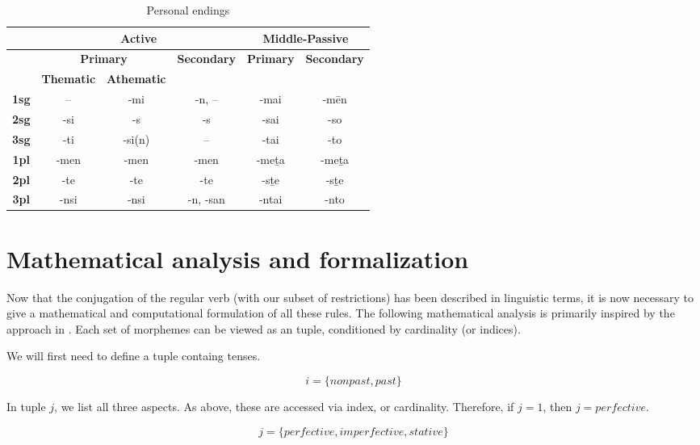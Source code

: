 \documentclass[12pt]{article}
\begin{document}
\begin{table*}
\centering
\begin{tabular}{|c|c|c|c|c|c|}
    \hline
    & \multicolumn{3}{c|}{\textbf{Active}} & \multicolumn{2}{c|}{\textbf{Middle-Passive}}\\ 
    \hline
    & \multicolumn{2}{c|}{\textbf{Primary}} & \multirow{2}{*}{\textbf{Secondary}} & \multirow{2}{*}{\textbf{Primary}} & \multirow{2}{*}{\textbf{Secondary}}\\
    \cline{2-3}
    & \textbf{Thematic} & \textbf{Athematic} & & &\\
    \hline
    \textbf{1sg} & --    & -mi       & -n, --    & -mai  & -mēn\\
    \hline
    \textbf{2sg} & -si   & -s        & -s        & -sai  & -so\\
    \hline
    \textbf{3sg} & -ti    & -si(n)    & --        & -tai  & -to\\
    \hline
    \textbf{1pl} & -men  & -men      & -men      & -meṯa & -meṯa\\
    \hline
    \textbf{2pl} & -te   & -te       & -te       & -sṯe  & -sṯe\\
    \hline
    \textbf{3pl} & -nsi  & -nsi      & -n, -san  & -ntai & -nto\\
    \hline  
\end{tabular}
\caption{Personal endings}
\label{tab:personal-endings}
\end{table*}

\section{Mathematical analysis and formalization}

Now that the conjugation of the regular verb (with our subset of restrictions)
has been described in linguistic terms, it is now necessary to give a
mathematical and computational formulation of all these rules. The following
mathematical analysis is primarily inspired by the approach in
\citet{lambek75}. Each set of morphemes can be viewed as an tuple, conditioned
by cardinality (or indices).

We will first need to define a tuple containg tenses.

\[i = \{nonpast,past\}\]

In tuple $j$, we list all three aspects. As above, these are accessed via
index, or cardinality. Therefore, if $j = 1$, then $j = perfective$.

\[j = \{perfective,imperfective,stative\}\]
\end{document}
